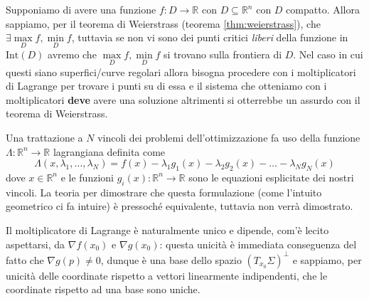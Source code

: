 \begin{remark}
Supponiamo di avere una funzione $f: D \to \mathbb{R}$ con $D \subseteq \mathbb{R}^n$ con $D$ compatto. Allora sappiamo, per il teorema di Weierstrass (teorema \ref{thm:weierstrass}), che $\exists \max\limits_{D} f, \min\limits_{D} f$, tuttavia se non vi sono dei punti critici \emph{liberi} della funzione in $\text{Int}(D)$ avremo che $\max\limits_{D} f, \min\limits_{D} f$ si trovano sulla frontiera di $D$. Nel caso in cui questi siano superfici/curve regolari allora bisogna procedere con i moltiplicatori di Lagrange per trovare i punti su di essa e il sistema che otteniamo con i moltiplicatori \textbf{deve} avere una soluzione altrimenti si otterrebbe un assurdo con il teorema di Weierstrass.
\end{remark}
\begin{remark}
Una trattazione a $N$ vincoli dei problemi dell'ottimizzazione fa uso della funzione $\Lambda: \mathbb{R}^n \to \mathbb{R}$ lagrangiana definita come 
$$
\Lambda(x, \lambda_1, \ldots, \lambda_N) = f(x)-\lambda_1 g_1(x) - \lambda_2 g_2(x) - \ldots - \lambda_N g_N(x)
$$
dove $x \in \mathbb{R}^n$ e le funzioni $g_i(x):\mathbb{R}^n \to \mathbb{R}$ sono le equazioni esplicitate dei nostri vincoli. La teoria per dimostrare che questa formulazione (come l'intuito geometrico ci fa intuire) è pressoché equivalente, tuttavia non verrà dimostrato.
\begin{remark}
Il moltiplicatore di Lagrange è naturalmente unico e dipende, com'è lecito aspettarsi, da $\nabla f(x_0)$ e $\nabla g(x_0)$: questa unicità è immediata conseguenza del fatto che $\nabla g(p) \neq 0$, dunque è una base dello spazio $(T_{x_0} \Sigma)^{\perp}$ e sappiamo, per unicità delle coordinate rispetto a vettori linearmente indipendenti, che le coordinate rispetto ad una base sono uniche.
\end{remark}
\end{remark}








